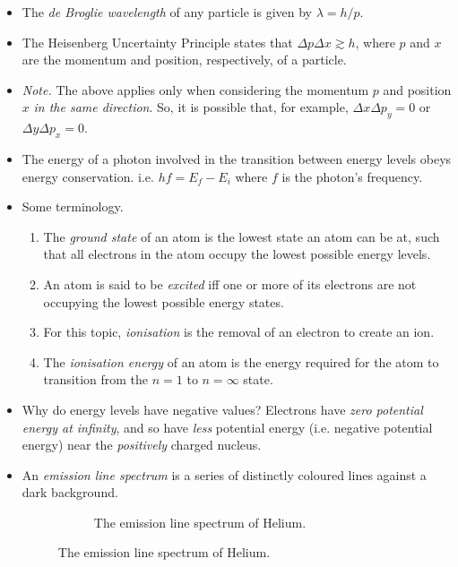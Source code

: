 \documentclass[oneside]{book}
\begin{document}
\begin{itemize}
    \item The \emph{de Broglie wavelength} of any particle is given by \(\lambda=h/p\).
    \item The Heisenberg Uncertainty Principle states that \(\Delta p\Delta x\gtrsim h\), where \(p\) and \(x\) are the momentum and position, respectively, of a particle. 
    \item \emph{Note.} The above applies only when considering the momentum \(p\) and position \(x\) \emph{in the same direction}. So, it is possible that, for example, \(\Delta x\Delta p_y=0\) or \(\Delta y\Delta p_x=0\).
    \item The energy of a photon involved in the transition between energy levels obeys energy conservation. i.e. \(hf=E_f-E_i\) where \(f\) is the photon's frequency.
    \item Some terminology.
    \begin{enumerate}
        \item The \emph{ground state} of an atom is the lowest state an atom can be at, such that all electrons in the atom occupy the lowest possible energy levels.
        \item An atom is said to be \emph{excited} iff one or more of its electrons are not occupying the lowest possible energy states.
        \item For this topic, \emph{ionisation} is the removal of an electron to create an ion.
        \item The \emph{ionisation energy} of an atom is the energy required for the atom to transition from the \(n=1\) to \(n=\infty\) state.
    \end{enumerate}
    \item Why do energy levels have negative values? Electrons have \emph{zero potential energy at infinity}, and so have \emph{less} potential energy (i.e. negative potential energy) near the \emph{positively} charged nucleus.
    \item[\AsteriskThin] An \emph{emission line spectrum} is a series of distinctly coloured lines against a dark background.
    \begin{figure}[H]
        \centering
        \begin{subfigure}[c]{\textwidth}
            \centering
            \pgfspectra[element=He,axis,label,label position=north west]
            \caption{The emission line spectrum of Helium.}
            \label{fig:emission-line-spectrum-helium}
        \end{subfigure}%


\end{figure}
\end{itemize}
\end{document}
